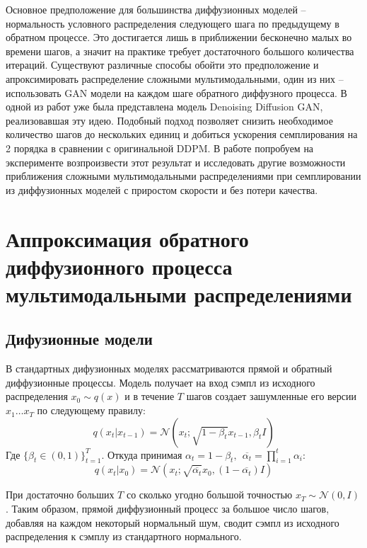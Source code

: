 \documentclass{article}
\begin{document}
 Основное предположение для большинства диффузионных моделей -- нормальность условного распределения следующего шага по предыдущему в обратном процессе. Это достигается лишь в приближении бесконечно малых во времени шагов, а значит на практике требует достаточного большого количества итераций. Существуют различные способы обойти это предположение и апроксимировать распределение сложными мультимодальными, один из них -- использовать GAN модели на каждом шаге обратного диффузного процесса. В одной из работ уже была представлена модель Denoising Diffusion GAN, реализовавшая эту идею. Подобный подход позволяет снизить необходимое количество шагов до нескольких единиц и добиться ускорения семплирования на 2 порядка в сравнении с оригинальной DDPM. В работе попробуем на эксперименте возпроизвести этот результат и исследовать другие возможности приближения сложными мультимодальными распределениями при семплировании из диффузионных моделей с приростом скорости и без потери качества.
 
 \section{Аппроксимация обратного диффузионного процесса мультимодальными распределениями}
 \subsection{Дифузионные модели}
 В стандартных дифузионных моделях \cite{https://doi.org/10.48550/arxiv.1503.03585, https://doi.org/10.48550/arxiv.2006.11239} рассматриваются прямой и обратный диффузионные процессы. Модель получает на вход сэмпл из исходного распределения $x_0\sim q(x)$ и в течение $T$ шагов создает зашумленные его версии $x_1\dots x_T$ по следующему правилу:
 \begin{equation}
 	q(x_t|x_{t-1}) = \mathcal{N}(x_t; \sqrt{1-\beta_t}x_{t-1}, \beta_t I)
 \end{equation}
Где $\{\beta_t \in (0, 1)\}_{t=1}^T$. Откуда принимая $\alpha_t = 1 - \beta_t,~~\overline{\alpha_t} = \prod_{i=1}^t \alpha_i$:
 \begin{equation}
	q(x_t|x_0) = \mathcal{N}(x_t; \sqrt{\overline{\alpha_t}}x_0, (1-\overline{\alpha_t})I)
\end{equation}

При достаточно больших $T$ со сколько угодно большой точностью $x_T\sim \mathcal{N}(0,I)$. Таким образом, прямой диффузионный процесс за большое число шагов, добавляя на каждом некоторый нормальный шум, сводит сэмпл из исходного распределения к сэмплу из стандартного нормального. 
\end{document}
